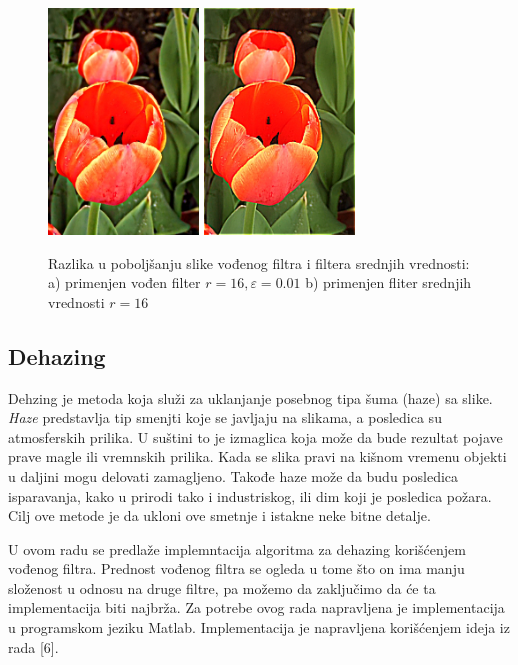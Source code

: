 \documentclass[a4paper,12pt,titlepage]{article}
\begin{document}
\begin{figure}[ht!]
\centering
\includegraphics[width=40mm]{img/flowerER.png}
\includegraphics[width=40mm]{img/flowerERAvg.png}
\caption{Razlika u poboljšanju slike vođenog filtra i filtera srednjih vrednosti: a) primenjen vođen filter $r = 16, \varepsilon = 0.01$ b) primenjen fliter srednjih vrednosti $r = 16$  }
\label{enha1}
\end{figure}

\newpage
\subsection{Dehazing}%

Dehzing je metoda koja služi za uklanjanje posebnog tipa šuma (haze) sa slike. \emph{Haze} predstavlja tip smenjti koje se javljaju na slikama, a posledica su atmosferskih prilika. U suštini to je izmaglica koja može da bude rezultat pojave prave magle ili vremnskih prilika. Kada se slika pravi na kišnom vremenu objekti u daljini mogu delovati zamagljeno. Takođe haze može da budu posledica isparavanja, kako u prirodi tako i industriskog, ili dim koji je posledica požara. Cilj ove metode je da ukloni ove smetnje i istakne neke bitne detalje.

U ovom radu se predlaže implemntacija algoritma za dehazing korišćenjem vođenog filtra. Prednost vođenog filtra se ogleda u tome što on ima manju složenost u odnosu na druge filtre, pa možemo da zaključimo da će ta implementacija biti najbrža. Za potrebe ovog rada napravljena je implementacija u programskom jeziku Matlab. Implementacija je napravljena korišćenjem ideja iz rada [6]. 
\end{document}
